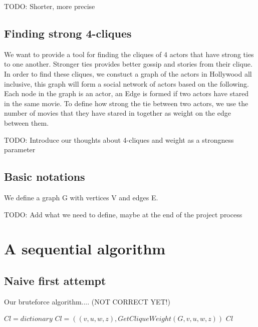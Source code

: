 \documentclass{article}
\begin{document}
TODO: Shorter, more precise


\subsection{Finding strong 4-cliques}
\noindent We want to provide a tool for finding the cliques of 4 actors that have strong ties to one another. Stronger ties provides better gossip and stories from their clique. In order to find these cliques, we constuct a graph of the actors in Hollywood all inclusive, this graph will form a social network of actors based on the following.
Each node in the graph is an actor, an Edge is formed if two actors have stared in the same movie. To define how strong the tie between two actors, we use the number of movies that they have stared in together as weight on the edge between them.

TODO: Introduce our thoughts about 4-cliques and weight as a strongness parameter

\subsection{Basic notations}
We define a graph G with vertices V and edges E.

TODO: Add what we need to define, maybe at the end of the project process


\section{A sequential algorithm}

\subsection{Naive first attempt}
Our bruteforce algorithm.... (NOT CORRECT YET!)

\begin{algorithm}
\caption{$Naive Max Edgeweighted 4Clique(G)$}
\begin{algorithmic}
\STATE $Cl = dictionary$
\STATE $Cl = ((v,u,w,z),Get Clique Weight(G,v,u,w,z))$
\ENDIF
\ENDIF
\ENDFOR
\ENDIF
\ENDFOR
\ENDFOR
\ENDFOR
\RETURN $Cl$

\end{algorithmic}
\end{algorithm}
\end{document}
